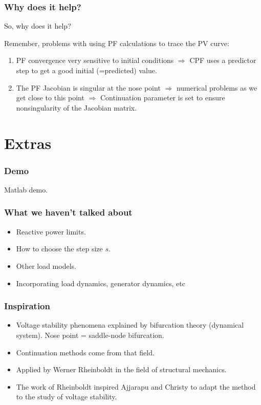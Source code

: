 \documentclass{beamer}
\begin{document}
\begin{frame}
\frametitle{Why does it help?}
So, why does it help?

Remember, problems with using PF calculations to trace the PV curve:
\begin{enumerate}
\item PF convergence very sensitive to initial conditions $\Rightarrow$ CPF uses a predictor step to get a good initial (=predicted) value.
\item The PF Jacobian is singular at the nose point $\Rightarrow$ numerical problems as we get close to this point $\Rightarrow$ Continuation parameter is set to ensure nonsingularity of the Jacobian matrix.
\end{enumerate}
\end{frame}

\section{Extras}

\begin{frame}
  \frametitle{Demo}
  Matlab demo.
\end{frame}

\begin{frame}
  \frametitle{What we haven't talked about}
  \begin{itemize}
  \item Reactive power limits.
  \item How to choose the step size $s$.
  \item Other load models.
  \item Incorporating load dynamics, generator dynamics, etc
  \end{itemize}
\end{frame}

\begin{frame}
  \frametitle{Inspiration}
  \begin{itemize}
  \item Voltage stability phenomena explained by bifurcation theory (dynamical system). Nose point = saddle-node bifurcation.
  \item Continuation methods come from that field.
  \item Applied by Werner Rheinboldt in the field of structural mechanics.
  \item The work of Rheinboldt inspired Ajjarapu and Christy to adapt the method to the study of voltage stability.
  \end{itemize}
\end{frame}
\end{document}
